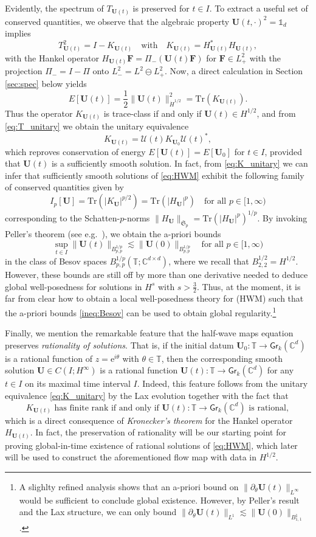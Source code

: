 \documentclass[10pt,reqno,a4paper]{amsart}
\theoremstyle{definition}
\theoremstyle{remark}
\theoremstyle{remark}
\numberwithin{equation}{section}
\newcommand{\C}{\mathbb{C}}
\newcommand{\T}{\mathbb{T}}
\newcommand{\pt}{\partial}
\newcommand{\be}{\begin{equation}}
\newcommand{\ee}{\end{equation}}
\newcommand{\eu}{\mathrm{e}}
\newcommand{\Ub}{\mathbf{U}}
\newcommand{\Fb}{\mathbf{F}}
\newcommand{\id}{I}
\newcommand{\Tr}{\mathrm{Tr}}
\newcommand{\Gr}{\mathsf{Gr}}
\newcommand{\Us}{\mathscr{U}}
\begin{document}
Evidently, the spectrum of $T_{\Ub(t)}$ is preserved for $t \in I$. To extract a useful set of conserved quantities, we observe that the algebraic property $\Ub(t,\cdot)^2= \mathds{1}_d$ implies 
$$
T_{\Ub(t)}^2 = \id - K_{\Ub(t)} \quad \mbox{with} \quad K_{\Ub(t)}= H^*_{\Ub(t)} H_{\Ub(t)},
$$
with the Hankel operator $H_{\Ub(t)}\Fb = \Pi_-(\Ub(t) \Fb)$ for $\Fb \in L^2_+$ with the projection $\Pi_- = \id -\Pi$ onto $L^2_- = L^2 \ominus L^2_+$. Now, a direct calculation in Section \ref{sec:spec} below yields
$$
E[\Ub(t)] = \frac{1}{2} \| \Ub(t) \|_{\dot{H}^{1/2}}^2 = \Tr(K_{\Ub(t)}).
$$
Thus the operator $K_{\Ub(t)}$ is trace-class if and only if $\Ub(t) \in H^{1/2}$, and from \eqref{eq:T_unitary} we obtain the unitary equivalence
\be \label{eq:K_unitary}
K_{\Ub(t)} = \Us(t) K_{\Ub_0} \Us(t)^*,
\ee
which reproves conservation of energy $E[\Ub(t)] = E[\Ub_0]$ for $t \in I$, provided that $\Ub(t)$ is a sufficiently smooth solution. In fact, from \eqref{eq:K_unitary} we can infer that sufficiently smooth solutions of \eqref{eq:HWM} exhibit the following family of conserved quantities given by
$$
I_p[\Ub] = \Tr(|K_\Ub|^{p/2}) = \Tr( |H_\Ub|^p)  \quad \mbox{for all $p \in [1, \infty)$}
$$
corresponding to the  Schatten-$p$-norms $\| H_\Ub \|_{\mathfrak{S}_p} = \Tr(|H_\Ub|^p)^{1/p}$. By invoking Peller's theorem (see e.g.~\cite{Pe-03}), we obtain the a-priori bounds
\be \label{ineq:Besov}
\sup_{t \in I} \| \Ub(t) \|_{B^{1/p}_{p,p}} \lesssim \| \Ub(0) \|_{B^{1/p}_{p,p}} \quad \mbox{for all $p \in [1,\infty)$}
\ee 
in the class of Besov spaces $B^{1/p}_{p,p}(\T; \C^{d \times d})$, where we recall that $B^{1/2}_{2,2} = H^{1/2}$. However, these bounds are still off by more than one derivative needed to deduce global well-posedness for solutions in $H^s$ with $s > \frac 3 2$. Thus, at the moment, it is far from clear how to obtain a  local well-posedness theory for (HWM) such that the a-priori bounds \eqref{ineq:Besov} can be used to obtain global regularity.\footnote{A slighlty refined analysis shows that an a-priori bound on  $\|\pt_\theta \Ub(t) \|_{L^\infty}$ would be sufficient to conclude global existence. However, by Peller's result and the Lax structure, we can only bound $\| \pt_\theta \Ub(t) \|_{L^1} \lesssim \| \Ub(0) \|_{B^1_{1,1}}$.}

Finally, we mention the remarkable feature that the half-wave maps equation preserves {\em rationality of solutions}. That is, if the initial datum $\Ub_0 : \T \to \Gr_k(\C^d)$ is a rational function of $z = \eu^{i \theta}$ with $\theta \in \T$, then the corresponding smooth solution $\Ub \in C(I; H^\infty)$ is a rational function $\Ub(t) : \T \to \Gr_k(\C^d)$ for any $t \in I$ on its maximal time interval $I$. Indeed, this feature follows from the unitary equivalence \eqref{eq:K_unitary} by the Lax evolution together with the fact that
$$
\mbox{$K_{\Ub(t)}$ has finite rank if and only if $\Ub(t) : \T \to \Gr_k(\C^d)$ is rational},
$$
which is a direct consequence of {\em Kronecker's theorem} for the Hankel operator $H_{\Ub(t)}$. In fact, the preservation of rationality will be our starting point for proving global-in-time existence of rational solutions of \eqref{eq:HWM}, which later will be used to construct the aforementioned flow map with data in $H^{1/2}$. 
\end{document}
